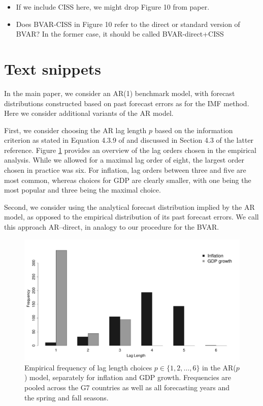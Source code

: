 \documentclass[11pt]{article}
\begin{document}
\begin{itemize}
	\item If we include CISS here, we might drop Figure 10 from paper. 
	\item Does BVAR-CISS in Figure 10 refer to the direct or standard version of BVAR? In the former case, it should be called BVAR-direct+CISS 
\end{itemize}

\section*{Text snippets}

In the main paper, we consider an AR(1) benchmark model, with forecast distributions constructed based on past forecast errors as for the IMF method. Here we consider additional variants of the AR model. 

First, we consider choosing the AR lag length $p$ based on the \cite{Schwarz1978} information criterion as stated in Equation 4.3.9 of \cite{Luetkepohl2005} and discussed in Section 4.3 of the latter reference. Figure \ref{fig:lag_length_choice} provides an overview of the lag orders chosen in the empirical analysis. While we allowed for a maximal lag order of eight, the largest order chosen in practice was six. For inflation, lag orders between three and five are most common, whereas choices for GDP are clearly smaller, with one being the most popular and three being the maximal choice. 

Second, we consider using the analytical forecast distribution implied by the AR model, as opposed to the empirical distribution of its past forecast errors. We call this approach AR--direct, in analogy to our procedure for the BVAR. 

\begin{figure}
\includegraphics[width =\textwidth]{ar_lag_length_choice.pdf}
\caption{Empirical frequency of lag length choices $p \in \{1, 2, \ldots, 6\}$ in the AR($p$) model, separately for inflation and GDP growth. Frequencies are pooled across the G7 countries as well as all forecasting years and the spring and fall seasons. \label{fig:lag_length_choice}}
\end{figure}



\end{document}
